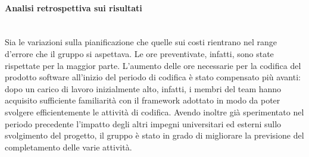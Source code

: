 \paragraph{Analisi retrospettiva sui risultati}\mbox{}\\
Sia le variazioni sulla pianificazione che quelle sui costi rientrano nel range d'errore che il gruppo si aspettava. 
Le ore preventivate, infatti, sono state rispettate per la maggior parte. L'aumento delle ore necessarie per la codifica del prodotto software all'inizio del periodo di codifica è stato compensato più avanti: dopo un carico di lavoro inizialmente alto, infatti, i membri del team hanno acquisito sufficiente familiarità con il framework adottato in modo da poter svolgere efficientemente le attività di codifica.
Avendo inoltre già sperimentato nel periodo precedente l'impatto degli altri impegni universitari ed esterni sullo svolgimento del progetto, il gruppo è stato in grado di migliorare la previsione del completamento delle varie attività.

